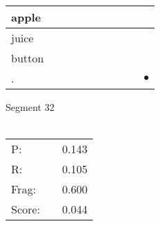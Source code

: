 \documentclass[landscape]{article}
\newcommand{\ssp}{\hspace{2pt}}
\newcommand{\mex}{\cellcolor{g}$\bullet$}
\begin{document}
\begin{tabular}{|l|p{10pt}|p{10pt}|p{10pt}|p{10pt}|p{10pt}|p{10pt}|p{10pt}|p{10pt}|p{10pt}|}
\hline
\ssp apple \ssp&\hspace{2pt}&\hspace{2pt}&\hspace{2pt}&\hspace{2pt}&\hspace{2pt}&\hspace{2pt}&\hspace{2pt}&\hspace{2pt}&\hspace{2pt}\\
\hline
\ssp juice \ssp&\hspace{2pt}&\hspace{2pt}&\hspace{2pt}&\hspace{2pt}&\hspace{2pt}&\hspace{2pt}&\hspace{2pt}&\hspace{2pt}&\hspace{2pt}\\
\hline
\ssp button \ssp&\hspace{2pt}&\hspace{2pt}&\hspace{2pt}&\hspace{2pt}&\hspace{2pt}&\hspace{2pt}&\hspace{2pt}&\hspace{2pt}&\hspace{2pt}\\
\hline
\ssp \cellcolor{ref8}. \ssp&\hspace{2pt}&\hspace{2pt}&\hspace{2pt}&\hspace{2pt}&\hspace{2pt}&\hspace{2pt}&\hspace{2pt}&\hspace{2pt}&\hspace{2pt}\mex\\
\hline
\end{tabular}

\vspace{6pt}
\noindent Segment 32\\\\
\noindent\begin{tabular}{lm{12pt}r}
\hline
P:&&0.143\\
R:&&0.105\\
Frag:&&0.600\\
Score:&&0.044\\
\end{tabular}
\end{document}
